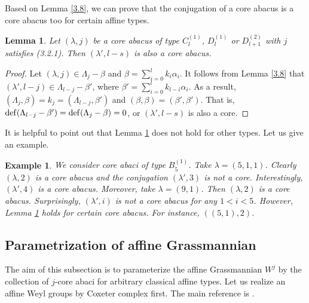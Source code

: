 \documentclass[11pt]{amsart}
\theoremstyle{plain}
\numberwithin{equation}{subsection}
\newtheorem{lemma}[theorem]{Lemma}
\newtheorem{example}[theorem]{Example}
\newcommand{\lam}{\lambda}
\begin{document}
Based on Lemma \ref{3.8}, we can prove that the conjugation of a core abacus is a core abacus too for certain affine types.

\begin{lemma}\label{3.9}
Let $(\lam, j)$ be a core abacus of type $C_l^{(1)}$, $D_l^{(1)}$ or $D_{l+1}^{(2)}$ with $j$ satisfies {\rm (3.2.1)}.
Then $(\lam', l-s)$ is also a core abacus.
\end{lemma}

\begin{proof}
Let $(\lam, j)\in \Lambda_j - \beta$ and $\beta=\sum_{i=0}^{l} k_i\alpha_i$.
It follows from Lemma \ref{3.8} that $(\lam', l-j)\in \Lambda_{l-j} -\beta'$, where $\beta'=\sum_{i=0}^{l} k_{l-i}\alpha_i$. 
As a result, $(\Lambda_j, \beta)=k_j=(\Lambda_{l-j}, \beta')$
and $(\beta, \beta)=(\beta', \beta')$. That is, ${\rm def}(\Lambda_{l-j} - \beta')={\rm def}(\Lambda_j - \beta)=0$, or $(\lam', l-s)$ is also a core.
\end{proof}

It is helpful to point out that Lemma \ref{3.9} does not hold for other types. Let us give an example.

\begin{example}\label{3.10}
{\rm
We consider core abaci of type $B_5^{(1)}$. Take $\lam=(5, 1, 1)$. Clearly $(\lam, 2)$ is a core abacus 
and the conjugation $(\lam', 3)$ is not a core. Interestingly, $(\lam', 4)$ is a core abacus. Moreover,
take $\lam=(9,1)$. Then $(\lam, 2)$ is a core abacus. Surprisingly, $(\lam', i)$ is not a core abacus for any $1< i< 5$.
However, Lemma \ref{3.9} holds for certain core abacus. For instance, $((5, 1), 2)$.}
\end{example}


\smallskip



\subsection{Parametrization of affine Grassmannian}
The aim of this subsection is to parameterize the affine Grassmannian $W^j$ 
by the collection of $j$-core abaci for arbitrary classical affine types.
Let us realize an affine Weyl groups by Coxeter complex first. The main reference is \cite{H}.
\end{document}
